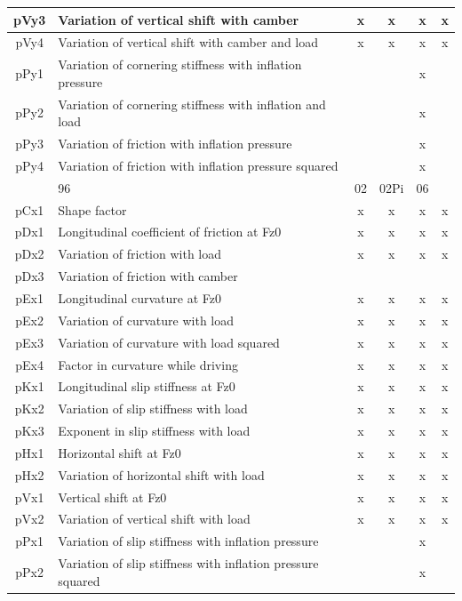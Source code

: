 \begin{center}
\begin{longtable}[c]{|c|p{4in}|cccc|}
			pVy3	&Variation of vertical shift with camber	&x	&x 	&x	&x\\ \hline
			pVy4	&Variation of vertical shift with camber and load 	&x 	&x	&x	&x\\ \hline
			pPy1	&Variation of cornering stiffness with inflation pressure			&&&x&	\\ \hline
			pPy2	&Variation of cornering stiffness with inflation and load	&&&x&	\\ \hline
			pPy3	&Variation of friction with inflation pressure 			&&&x&	\\ \hline
			pPy4	&Variation of friction with inflation pressure squared	&&&x&	\\ \hline
			\rowcolor{ttblue}\multicolumn{2}{|c|}{\cellcolor{ttblue}\textbf{Pure Longitudinal}}&96&	02&	 02Pi&	06 \\ \hline
			pCx1	&Shape factor	&x	&x		&x &x\\ \hline
			pDx1	&Longitudinal coefficient of friction at Fz0	&x &x		&x	&x\\ \hline
			pDx2	&Variation of friction with load	&x	&x &x		&x\\ \hline
			pDx3	&Variation of friction with camber	&	& 	&	&\\ \hline
			pEx1	&Longitudinal curvature at Fz0	&x	&x 	&x	&x\\ \hline
			pEx2	&Variation of curvature with load	&x	&x &x		&x\\ \hline
			pEx3	&Variation of curvature with load squared 	&x &x		&x&	x\\ \hline
			pEx4	&Factor in curvature while driving 	&x	&x	&x 	&x\\ \hline
			pKx1	&Longitudinal slip stiffness at Fz0	&x	&x	&x	&x\\ \hline
			pKx2	&Variation of slip stiffness with load	&x	&x	&x	&x\\ \hline
			pKx3	&Exponent in slip stiffness with load	&x	&x 	&x	&x\\ \hline
			pHx1	&Horizontal shift at Fz0	&x	&x	&x	&x\\ \hline
			pHx2	&Variation of horizontal shift with load 	&x 	&x	&x	&x\\ \hline
			pVx1	&Vertical shift at Fz0	&x	&x 	&x	&x\\ \hline
			pVx2	&Variation of vertical shift with load	&x	&x &x	&x\\ \hline
			pPx1	&Variation of slip stiffness with inflation pressure 	&&&x&	\\ \hline
			pPx2	&Variation of slip stiffness with inflation pressure squared	&&&x&	\\ \hline

\end{longtable}
\end{center}
